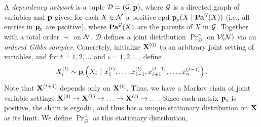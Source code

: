 \documentclass{article}
\begin{document}
\begin{wip}
	
	\begin{defn}
	A \emph{dependency network} is a tuple $\mathcal D = (\Gr, \mat p) $, where
	$\Gr$ is a 
	directed graph of variables and $\mat p$ gives, for each $X \in \N$ a
	positive cpd $\bp[X](X \mid \Pa^{\Gr}(X))$ (i.e., all entries in $\bp[X]$ are
	psoitive),
	where $\Pa^{\Gr}(X)$ are the parents of $X$ in $\Gr$.
	Together with a total order $\prec$ on $\N$,
	$\mathcal D$ defines a joint distribution $\Pr^\prec_{\mathcal D}$ on $\V(\N)$ via an \emph{ordered Gibbs sampler}. 
	Concretely,
	initialize $\mat X^{(0)}$ to an arbitrary joint setting of variables, and
	for $t= 1,2, \ldots$ and $i=1,2,\ldots$, define
	\[
		 X_i^{(t)} \sim \bp[i]\left(X_i ~\big|~ x_1^{(t)}, \ldots,
	x_{i-1}^{(t)}, x_{i+1}^{(t-1)}, \ldots, x^{(t-1)}_{n} \right).  
	\]
	Note that $\mat X^{(t+1)}$
	depends only on $\mat X^{(t)}$. Thus, we have a Markov chain of
	joint variable settings 
	$ \mat X^{(0)} \to \mat X^{(1)} \to \ldots \to \mat X^{(t)} \to \ldots$.
	Since each matrix $\bp[X]$ is positive,
	the chain is
	ergodic, 
	and thus has a unique stationary distribution on $\mat X$ as its limit.
	We define $\Pr^\prec_{\mathcal D}$ as this stationary distribution,
	\end{defn}
	

\end{wip}
\end{document}

